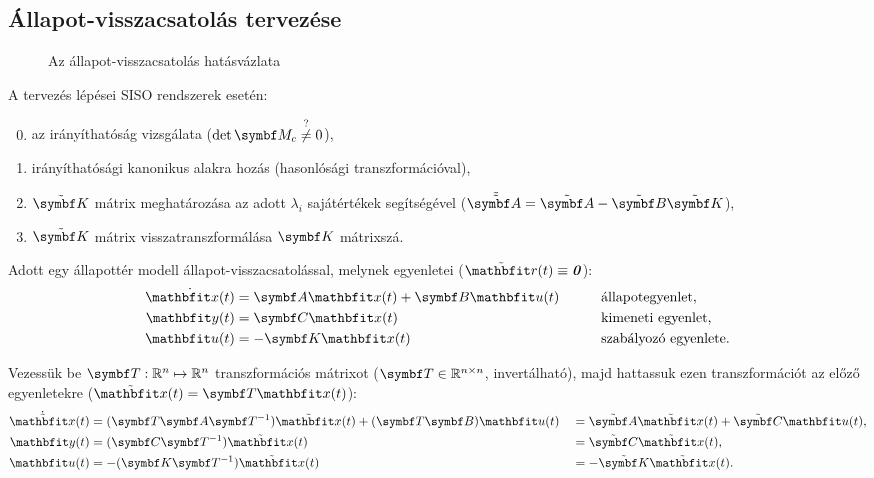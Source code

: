 \subsection{Állapot-visszacsatolás tervezése}

\begin{figure}[htb]
  \centering
  
  \caption{Az állapot-visszacsatolás hatásvázlata}
  \label{fig:state-feedback}
\end{figure}

A tervezés lépései SISO rendszerek esetén:
\begin{enumerate}[label={\color{darkRed}\theenumi})]
  \setcounter{enumi}{-1}
  \item az irányíthatóság vizsgálata ($\det \rmat M_c \overset{?}{\neq} 0$),
  \item irányíthatósági kanonikus alakra hozás (hasonlósági transzformációval),
  \item $\tilde{\rmat K}$ mátrix meghatározása az adott $\lambda_i$ sajátértékek
        segítségével ($\tilde{\tmat A} = \tmat A - \tmat B \tmat K$),
  \item $\tilde{\rmat K}$ mátrix visszatranszformálása $\rmat K$ mátrixszá.
\end{enumerate}

Adott egy állapottér modell állapot-visszacsatolással, melynek egyenletei
($\tvec r(t) \equiv \nvec$):
\begin{alignat}{9}
  \dot{\rvec x(t)} & = \rmat A \rvec x(t) + \rmat B \rvec u(t) \quad \quad
                   &
                   & \text{állapotegyenlet,}
  \\
  \rvec y(t)       & = \rmat C \rvec x(t)
                   &
                   & \text{kimeneti egyenlet,}
  \\
  \rvec u(t)       & = - \rmat K \rvec x(t)
                   &
                   & \text{szabályozó egyenlete.}
\end{alignat}

Vezessük be $\rmat T: \mathbb R^n \mapsto \mathbb R^n$ transzformációs mátrixot
($\rmat T \in \mathbb R^{n \times n}$, invertálható), majd hattassuk ezen
transzformációt az előző egyenletekre ($\tvec x(t) = \rmat T \rvec x(t)$):
\begin{alignat}{9}
  \dot{\tvec x}(t) & = (\rmat T \rmat A \rmat T^{-1}) \tvec x(t) + (\rmat T \rmat B) \rvec u(t)
                   &
                   & = \tmat A \tvec x(t) + \tmat C \rvec u(t),
  \\
  \rvec y(t)       & = (\rmat C \rmat T^{-1}) \tvec x(t)
                   &
                   & = \tmat C \tvec x(t),
  \\
  \rvec u(t)       & = - (\rmat K \rmat T^{-1}) \tvec x(t)
                   &
                   & = - \tmat K \tvec x(t).
\end{alignat}

